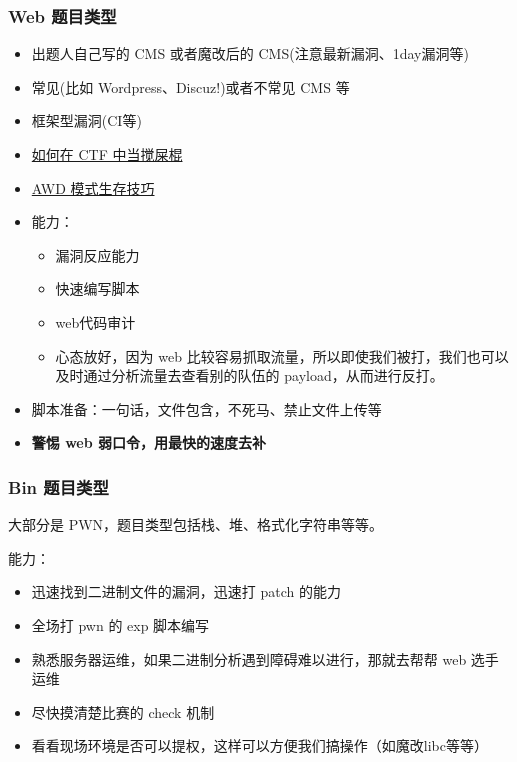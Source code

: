 \subsubsection{Web 题目类型}\setlength{\parindent}{2em}
\begin{itemize}
    \item 出题人自己写的 CMS 或者魔改后的 CMS(注意最新漏洞、1day漏洞等)
    \item 常见(比如 Wordpress、Discuz!)或者不常见 CMS 等
    \item 框架型漏洞(CI等)
    \item \href{http://www.mamicode.com/info-detail-1590551.html}{如何在 CTF 中当搅屎棍}
    \item \href{http://bobao.360.cn/ctf/detail/169.html}{AWD 模式生存技巧}
    \item 能力：
    \begin{itemize}
        \item 漏洞反应能力
        \item 快速编写脚本
        \item web代码审计
        \item 心态放好，因为 web 比较容易抓取流量，所以即使我们被打，我们也可以及时通过分析流量去查看别的队伍的 payload，从而进行反打。
    \end{itemize}
    \item 脚本准备：一句话，文件包含，不死马、禁止文件上传等
    \item \textbf{警惕 web 弱口令，用最快的速度去补}
\end{itemize}


\subsubsection{Bin 题目类型}
\indent \setlength{\parindent}{2em}
\indent 大部分是 PWN，题目类型包括栈、堆、格式化字符串等等。

\indent 能力：
\begin{itemize}
    \item 迅速找到二进制文件的漏洞，迅速打 patch 的能力
    \item 全场打 pwn 的 exp 脚本编写
    \item 熟悉服务器运维，如果二进制分析遇到障碍难以进行，那就去帮帮 web 选手运维
    \item 尽快摸清楚比赛的 check 机制
    \item 看看现场环境是否可以提权，这样可以方便我们搞操作（如魔改libc等等）
\end{itemize}

